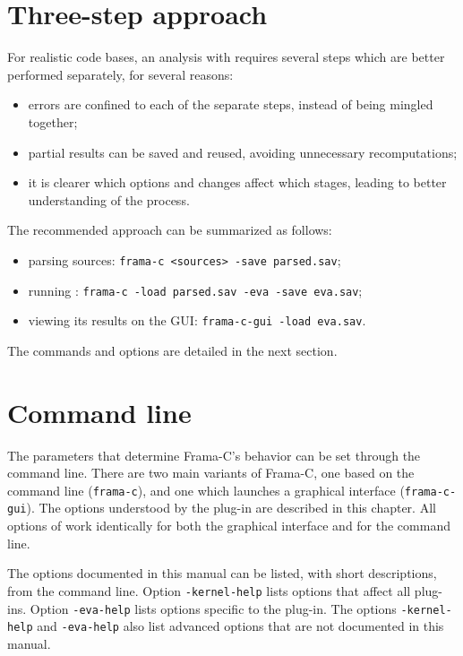 \documentclass{frama-c-book}
\begin{document}
\section{Three-step approach}
\label{three-step}

For realistic code bases, an analysis with \Eva{} requires several steps which
are better performed separately, for several reasons:

\begin{itemize}
\item errors are confined to each of the separate steps, instead of being
  mingled together;
\item partial results can be saved and reused, avoiding unnecessary
  recomputations;
\item it is clearer which options and changes affect which stages, leading to
  better understanding of the process.
\end{itemize}

The recommended approach can be summarized as follows:

\begin{itemize}
\item parsing sources: \verb|frama-c <sources> -save parsed.sav|;
\item running \Eva{}:  \verb|frama-c -load parsed.sav -eva -save eva.sav|;
\item viewing its results on the GUI: \verb|frama-c-gui -load eva.sav|.
\end{itemize}

The commands and options are detailed in the next section.

\section{Command line}
\label{command-line}

The parameters that determine Frama-C's behavior can be
set through the command line. There are two main variants of Frama-C,
one based on the command line (\lstinline|frama-c|), and one which launches
a graphical interface (\lstinline|frama-c-gui|).
The options understood by the \Eva{} plug-in are described in
this chapter.
All options of \Eva{} work identically for both the graphical interface
and for the command line.

\bigskip

The options documented in this manual can be listed,
with short descriptions, from the command line.
Option \lstinline|-kernel-help|
lists options that affect all plug-ins. Option
\lstinline|-eva-help| lists options specific to the
\Eva{} plug-in. The options \lstinline|-kernel-help| and
\lstinline|-eva-help| also list advanced options that are
not documented in this manual.
\end{document}
